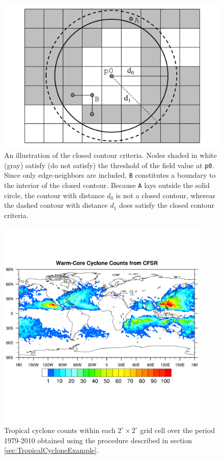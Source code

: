 \documentclass[gmdd, hvmath]{copernicus}
\begin{document}
\begin{figure}
\begin{center}
\includegraphics[width=5in]{ClosedContourCriteria2.pdf}
\end{center}
\caption{An illustration of the closed contour criteria.  Nodes shaded in white (gray) satisfy (do not satisfy) the threshold of the field value at \texttt{p0}.  Since only edge-neighbors are included, \texttt{B} constitutes a boundary to the interior of the closed contour.  Because \texttt{A} lays outside the solid circle, the contour with distance $d_0$ is not a closed contour, whereas the dashed contour with distance $d_1$ does satisfy the closed contour criteria.} \label{fig:ClosedContour}
\end{figure}

\begin{figure}
\begin{center}
\includegraphics[width=4in, clip, trim=0.2cm 3.6cm 0.2cm 3.1cm]{plot-cfsr_tc_density.pdf}
\end{center}
\caption{Tropical cyclone counts within each $2^\circ \times 2^\circ$ grid cell over the period 1979-2010 obtained using the procedure described in section \ref{sec:TropicalCycloneExample}.} \label{fig:TropicalCycloneDensity}
\end{figure}
\end{document}
